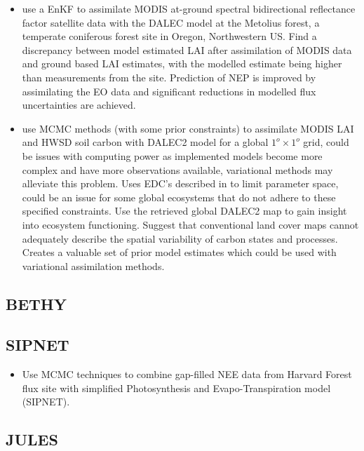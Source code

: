 \documentclass[12pt, a4paper]{article}
\begin{document}
\begin{itemize}
\item \citet{Quaife2008} use a EnKF to assimilate MODIS at-ground spectral bidirectional reflectance factor satellite data with the DALEC model at the Metolius forest, a temperate coniferous forest site in Oregon, Northwestern US. Find a discrepancy between model estimated LAI after assimilation of MODIS data and ground based LAI estimates, with the modelled estimate being higher than measurements from the site. Prediction of NEP is improved by assimilating the EO data and significant reductions in modelled flux uncertainties are achieved.    

\item \citet{bloom2016decadal} use MCMC methods (with some prior constraints) to assimilate MODIS LAI and HWSD soil carbon with DALEC2 model for a global \(1^o \times 1^o\) grid, could be issues with computing power as implemented models become more complex and have more observations available, variational methods may alleviate this problem. Uses EDC's described in \citet{Bloom2015} to limit parameter space, could be an issue for some global ecosystems that do not adhere to these specified constraints. Use the retrieved global DALEC2 map to gain insight into ecosystem functioning. Suggest that conventional land cover maps cannot adequately describe  the spatial variability of carbon states and processes. Creates a valuable set of prior model estimates which could be used with variational assimilation methods.

\end{itemize}


\subsection{BETHY}

\subsection{SIPNET}

\begin{itemize}

\item \citet{braswell2005estimating} Use MCMC techniques to combine gap-filled NEE data from Harvard Forest flux site with simplified Photosynthesis and Evapo-Transpiration model (SIPNET).

\end{itemize}

\subsection{JULES}
\end{document}
